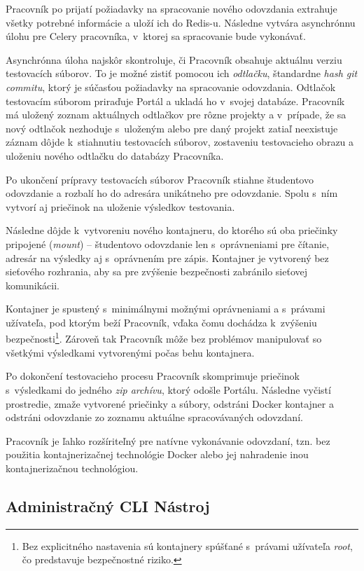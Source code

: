 \documentclass[
  digital, %
  oneside, %
  table,   %
  lof,     %
  lot,   %
]{fithesis3}
\begin{document}
Pracovník po prijatí požiadavky na spracovanie nového odovzdania extrahuje všetky potrebné informácie a uloží ich do Redis-u. Následne vytvára asynchrónnu úlohu pre Celery pracovníka, v~ktorej sa spracovanie bude vykonávať.

Asynchrónna úloha najskôr skontroluje, či Pracovník obsahuje aktuálnu verziu testovacích súborov. To je možné zistiť pomocou ich \emph{odtlačku}, štandardne \emph{hash git commitu}, ktorý je súčasťou požiadavky na spracovanie odovzdania. Odtlačok testovacím súborom priraďuje Portál a ukladá ho v~svojej databáze. Pracovník má uložený zoznam aktuálnych odtlačkov pre rôzne projekty a v~prípade, že sa nový odtlačok nezhoduje s~uloženým alebo pre daný projekt zatiaľ neexistuje záznam dôjde k~stiahnutiu testovacích súborov, zostaveniu testovacieho obrazu a uloženiu nového odtlačku do databázy Pracovníka. 

Po ukončení prípravy testovacích súborov Pracovník stiahne študentovo odovzdanie a rozbalí ho do adresára unikátneho pre odovzdanie. Spolu s~ním vytvorí aj priečinok na uloženie výsledkov testovania. 

Následne dôjde k~vytvoreniu nového kontajneru, do ktorého sú oba priečinky pripojené (\emph{mount}) -- študentovo odovzdanie len s~oprávneniami pre čítanie, adresár na výsledky aj s~oprávnením pre zápis. Kontajner je vytvorený bez sieťového rozhrania, aby sa pre zvýšenie bezpečnosti zabránilo sieťovej komunikácii.

Kontajner je spustený s~minimálnymi možnými oprávneniami a s~právami užívateľa, pod ktorým beží Pracovník, vďaka čomu dochádza k~zvýšeniu bezpečnosti\footnote{Bez explicitného nastavenia sú kontajnery spúšťané s~právami užívateľa \emph{root}, čo predstavuje bezpečnostné riziko.}. Zároveň tak Pracovník môže bez problémov manipulovať so všetkými výsledkami vytvorenými počas behu kontajnera.

Po dokončení testovacieho procesu Pracovník skomprimuje priečinok s~výsledkami do jedného \emph{zip archívu}, ktorý odošle Portálu. Následne vyčistí prostredie, zmaže vytvorené priečinky a súbory, odstráni Docker kontajner a odstráni odovzdanie zo zoznamu aktuálne spracovávaných odovzdaní.

Pracovník je ľahko rozšíriteľný pre natívne vykonávanie odovzdaní, tzn. bez použitia kontajnerizačnej technológie Docker alebo jej nahradenie inou kontajnerizačnou technológiou.

\subsection{Administračný CLI Nástroj}
\end{document}
